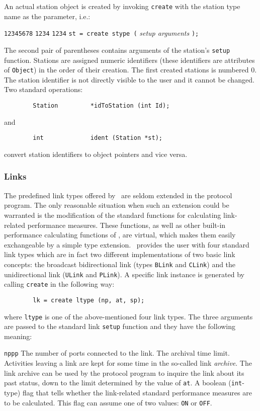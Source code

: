 An actual station object is created by invoking {\tt create} with the station
type name as the parameter, i.e.:
{\small
\begin{tabbing}
{\tt 12345678} \= {\tt 1234} \= {\tt 1234} \kill
\> {\tt st = create stype (} {\em setup arguments\/} {\tt );} \\
\end{tabbing} }
The second pair of parentheses contains arguments of the station's {\tt setup}
function.
Stations are assigned numeric identifiers (these identifiers are
attributes of {\tt Object}) in the order of their creation.
The first created stations is numbered $0$.
The station identifier is not directly visible to the user and it cannot be
changed.
Two standard operations:
{\small
\begin{verbatim}
        Station         *idToStation (int Id);
\end{verbatim} }
\noindent
and
{\small
\begin{verbatim}
        int             ident (Station *st);
\end{verbatim} }
\noindent
convert station identifiers to object pointers and vice versa.

\subsubsection{Links}

The predefined link types offered by \smurph\ are seldom extended in the
protocol program.
The only reasonable situation when such an extension could be warranted is
the
modification of the standard functions for calculating link-related
performance measures.
These functions, as well as other built-in performance calculating functions
of \smurph, are virtual, which makes them easily exchangeable by a simple type
extension.
\smurph\ provides the user with four standard link types which are in fact
two different implementations of two basic link concepts: the broadcast
bidirectional link (types {\tt BLink} and {\tt CLink}) and the unidirectional
link ({\tt ULink} and {\tt PLink}).
A specific link instance is generated by calling {\tt create} in the following
way:
{\small
\begin{verbatim}
        lk = create ltype (np, at, sp);
\end{verbatim} }
\noindent
where {\tt ltype} is one of the above-mentioned four link types.
The three arguments are passed to the standard link {\tt setup} function
and they have the following meaning:
\begin{llist}{{\tt nppp}}
The number of ports connected to the link.
The archival time limit.
Activities leaving a link are kept for some time in the so-called
link {\em archive}.
The link archive can be used by the protocol program to inquire the link
about its past status, down to the limit determined by the value of {\tt at}.
A boolean ({\tt int}-type) flag that tells whether the link-related standard
performance measures are to be calculated.
This flag can assume one of two values: {\tt ON} or {\tt OFF}.
\end{llist}


